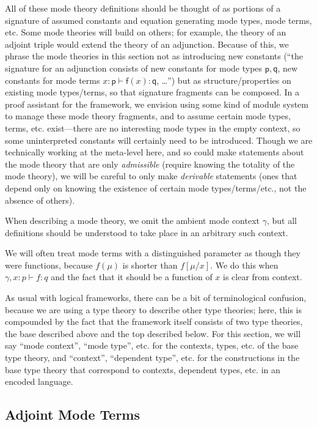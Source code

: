 \documentclass[10pt]{article}
\theoremstyle{definition}
\newcommand{\yields}{\vdash}
\begin{document}
All of these mode theory definitions should be thought of as portions of
a signature of assumed constants and equation generating mode types,
mode terms, etc.  Some mode theories will build on others; for example,
the theory of an adjoint triple would extend the theory of an
adjunction.  Because of this, we phrase the mode theories in this
section not as introducing new constants (``the signature for an
adjunction consists of new constants for mode types $\mathsf{p},
\mathsf{q}$, new constants for mode terms $x : \mathsf{p} \vdash
\mathsf{f}(x) : \mathsf{q}$, \ldots'') but as structure/properties on
existing mode types/terms, so that signature fragments can be composed.
In a proof assistant for the framework, we envision using some kind of
module system to manage these mode theory fragments, and to assume
certain mode types, terms, etc. exist---there are no
interesting mode types in the empty context, so some
uninterpreted constants will certainly need to be introduced.  Though we are
technically working at the meta-level here, and so could make statements
about the mode theory that are only \emph{admissible} (require knowing
the totality of the mode theory), we will be careful to only make
\emph{derivable} statements (ones that depend only on knowing the
existence of certain mode types/terms/etc., not the absence of others).

When describing a mode theory, we omit the ambient mode context
$\gamma$, but all definitions should be understood to take place in an
arbitrary such context.

We will often treat mode terms with a distinguished parameter as though
they were functions, because $f(\mu)$ is shorter than $f[\mu/x]$.  We do
this when $\gamma, x : p \yields f : q$ and the fact that it should be a
function of $x$ is clear from context.

As usual with logical frameworks, there can be a bit of terminological
confusion, because we are using a type theory to describe other type
theories; here, this is compounded by the fact that the framework itself
consists of two type theories, the base described above and the top
described below.  For this section, we will say ``mode context'', ``mode
type'', etc. for the contexts, types, etc. of the base type theory, and
``context'', ``dependent type'', etc. for the constructions in the base
type theory that correspond to contexts, dependent types, etc. in an
encoded language.  

\subsection{Adjoint Mode Terms}
\end{document}
